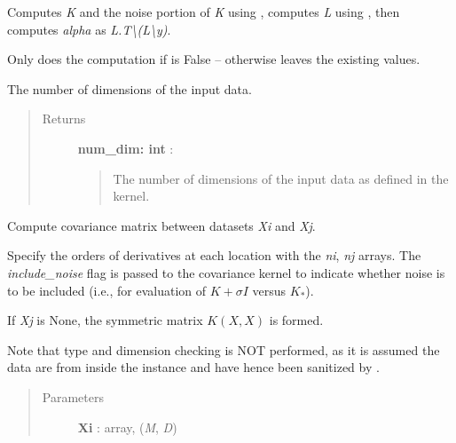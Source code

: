 \documentclass[letterpaper,10pt,english]{sphinxmanual}
\begin{document}
\begin{fulllineitems}
\begin{fulllineitems}
Computes \emph{K} and the noise portion of \emph{K} using {\hyperref[gptools:gptools.gaussian_process.GaussianProcess.compute_Kij]{}},
computes \emph{L} using , then computes
\emph{alpha} as \emph{L.T\textbackslash{}(L\textbackslash{}y)}.

Only does the computation if  is False --
otherwise leaves the existing values.

\end{fulllineitems}


\begin{fulllineitems}
\label{gptools:gptools.gaussian_process.GaussianProcess.num_dim}
The number of dimensions of the input data.
\begin{quote}\begin{description}
\item[{Returns}] \leavevmode
\textbf{num\_dim: int} :
\begin{quote}

The number of dimensions of the input data as defined in the kernel.
\end{quote}

\end{description}\end{quote}

\end{fulllineitems}


\begin{fulllineitems}
\label{gptools:gptools.gaussian_process.GaussianProcess.compute_Kij}
Compute covariance matrix between datasets \emph{Xi} and \emph{Xj}.

Specify the orders of derivatives at each location with the \emph{ni}, \emph{nj}
arrays. The \emph{include\_noise} flag is passed to the covariance kernel to
indicate whether noise is to be included (i.e., for evaluation of
\(K+\sigma I\) versus \(K_*\)).

If \emph{Xj} is None, the symmetric matrix \(K(X, X)\) is formed.

Note that type and dimension checking is NOT performed, as it is assumed
the data are from inside the instance and have hence been sanitized by
{\hyperref[gptools:gptools.gaussian_process.GaussianProcess.add_data]{}}.
\begin{quote}\begin{description}
\item[{Parameters}] \leavevmode
\textbf{Xi} : array, (\emph{M}, \emph{D})
\begin{quote}


\end{quote}
\end{description}
\end{quote}
\end{fulllineitems}
\end{fulllineitems}
\end{document}
